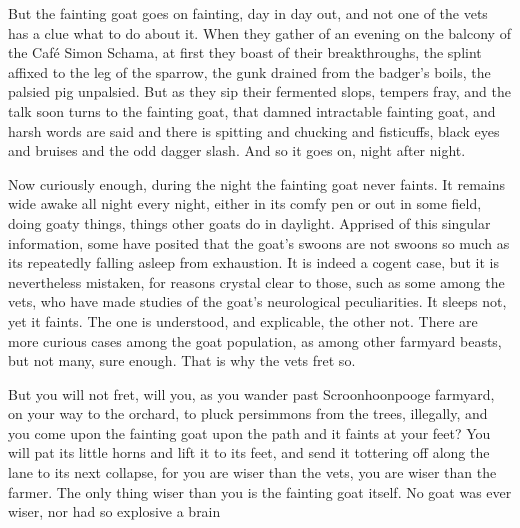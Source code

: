 But the fainting goat goes on fainting, day in day out, and not one of the vets has a clue what to do about it. When they gather of an evening on the balcony of the Caf\'{e} Simon Schama, at first they boast of their breakthroughs, the splint affixed to the leg of the sparrow, the gunk drained from the badger's boils, the palsied pig unpalsied. But as they sip their fermented slops, tempers fray, and the talk soon turns to the fainting goat, that damned intractable fainting goat, and harsh words are said and there is spitting and chucking and fisticuffs, black eyes and bruises and the odd dagger slash. And so it goes on, night after night.

Now curiously enough, during the night the fainting goat never faints. It remains wide awake all night every night, either in its comfy pen or out in some field, doing goaty things, things other goats do in daylight. Apprised of this singular information, some have posited that the goat's swoons are not swoons so much as its repeatedly falling asleep from exhaustion. It is indeed a cogent case, but it is nevertheless mistaken, for reasons crystal clear to those, such as some among the vets, who have made studies of the goat's neurological peculiarities. It sleeps not, yet it faints. The one is understood, and explicable, the other not. There are more curious cases among the goat population, as among other farmyard beasts, but not many, sure enough. That is why the vets fret so.

But you will not fret, will you, as you wander past Scroonhoonpooge farmyard, on your way to the orchard, to pluck persimmons from the trees, illegally, and you come upon the fainting goat upon the path and it faints at your feet? You will pat its little horns and lift it to its feet, and send it tottering off along the lane to its next collapse, for you are wiser than the vets, you are wiser than the farmer. The only thing wiser than you is the fainting goat itself. No goat was ever wiser, nor had so explosive a brain